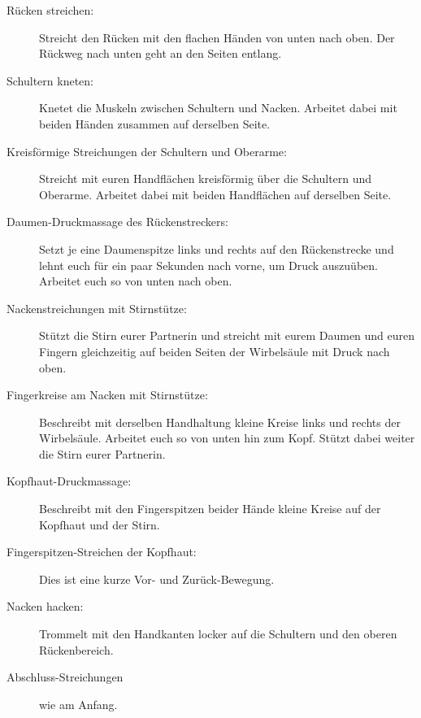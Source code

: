 \begin{description}
  \item [Rücken streichen:] Streicht den Rücken mit den flachen Händen von unten nach oben. Der Rückweg nach unten geht an den Seiten entlang.
  \item [Schultern kneten:] Knetet die Muskeln zwischen Schultern und Nacken. Arbeitet dabei mit beiden Händen zusammen auf derselben Seite.
  \item [Kreisförmige Streichungen der Schultern und Oberarme:] Streicht mit euren Handflächen kreisförmig über die Schultern und Oberarme. Arbeitet dabei mit beiden Handflächen auf derselben Seite.
  \item [Daumen-Druckmassage des Rückenstreckers:] Setzt je eine Daumenspitze links und rechts auf den Rückenstrecke und lehnt euch für ein paar Sekunden nach vorne, um Druck auszuüben. Arbeitet euch so von unten nach oben.
  \item [Nackenstreichungen mit Stirnstütze:] Stützt die Stirn eurer Partnerin und streicht mit eurem Daumen und euren Fingern gleichzeitig auf beiden Seiten der Wirbelsäule mit Druck nach oben.
  \item [Fingerkreise am Nacken mit Stirnstütze:] Beschreibt mit derselben Handhaltung kleine Kreise links und rechts der Wirbelsäule. Arbeitet euch so von unten hin zum Kopf. Stützt dabei weiter die Stirn eurer Partnerin.
  \item [Kopfhaut-Druckmassage:] Beschreibt mit den Fingerspitzen beider Hände kleine Kreise auf der Kopfhaut und der Stirn.
  \item [Fingerspitzen-Streichen der Kopfhaut:] Dies ist eine kurze Vor- und Zurück-Bewegung.
  \item [Nacken hacken:] Trommelt mit den Handkanten locker auf die Schultern und den oberen Rückenbereich.
  \item [Abschluss-Streichungen] wie am Anfang.
\end{description}
